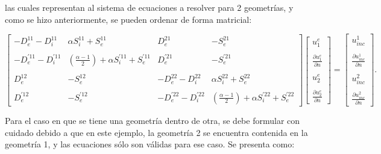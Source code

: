 \documentclass[12pt,letterpaper]{article}
\numberwithin{equation}{section}
\begin{document}
\noindent las cuales representan al sistema de ecuaciones a resolver para 2 geometrías, y como se hizo anteriormente, se pueden ordenar de forma matricial:

\begin{equation} 
\begin{bmatrix}
-D_{e}^{11} - D_{i}^{11} & \alpha S_{i}^{11} + S_{e}^{11} & D_{e}^{21} & -S_{e}^{21} \\
\\
-D_{e}^{'11} - D_{i}^{'11} & (\frac{\alpha - 1}{2})+\alpha S_{i}^{'11} + S_{e}^{'11} & D_{e}^{'21} & -S_{e}^{'21}\\
\\
D_{e}^{12} & -S_{e}^{12} & -D_{e}^{22} - D_{i}^{22} & \alpha S_{i}^{22} + S_{e}^{22}\\
\\
D_{e}^{'12} & -S_{e}^{'12} & -D_{e}^{'22} - D_{i}^{'22} & (\frac{\alpha - 1}{2})+\alpha S_{i}^{'22} + S_{e}^{'22}
\end{bmatrix}
\begin{bmatrix}
u^{e}_1\\
\\
\frac{\partial u^{e}_1}{\partial n}\\
\\
u^{e}_2\\
\\
\frac{\partial u^{e}_2}{\partial n}
\end{bmatrix}
=
\begin{bmatrix}
u_{inc}^1\\
\\
\frac{\partial u_{inc}^1}{\partial n}\\
\\
u_{inc}^2\\
\\
\frac{\partial u_{inc}^2}{\partial n}
\end{bmatrix}.
\label{eq:multi2_matriz ext}		 
\end{equation} 

Para el caso en que se tiene una geometría dentro de otra, se debe formular con cuidado debido a que en este ejemplo, la geometría 2 se encuentra contenida en la geometría 1, y las ecuaciones sólo son válidas para ese caso. Se presenta como:
\end{document}
